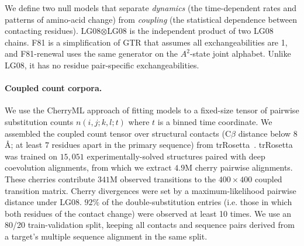 \documentclass{article}
\newcommand{\Pfam}{\textsc{Pfam}}
\begin{document}
We define two null models that separate \emph{dynamics} (the time-dependent rates and patterns 
of amino-acid change) from \emph{coupling} (the statistical dependence between contacting residues). 
LG08$\otimes$LG08 is the independent product of two LG08 chains. F81 is a simplification of GTR that assumes all exchangeabilities are 1, and F81-renewal uses the same generator on the $A^2$-state joint alphabet. Unlike LG08, it has no residue pair-specific exchangeabilities.

\paragraph{Coupled count corpora.} We use the CherryML approach of fitting models 
to a fixed-size tensor of pairwise substitution counts $n(i,j;k,l;t)$ where $t$ is a binned 
time coordinate. We assembled the coupled count tensor 
over structural contacts (C$\beta$ distance below $8$ \AA; at least $7$ residues 
apart in the primary sequence) from trRosetta~\cite{Yang2020trRosetta}. 
trRosetta was trained on $15{,}051$ 
experimentally-solved structures paired with deep coevolution alignments, 
from which we extract $4.9$M cherry pairwise alignments.
These cherries contribute $341$M observed transitions to the $400 \times 400$ 
coupled transition matrix. Cherry divergences were set by a 
maximum-likelihood pairwise distance under LG08. 
$92\%$ of the double-substitution entries (i.e. those in which both residues of the 
contact change) were observed at least 10 times.
We use an 80/20 train-validation split, keeping all contacts and sequence pairs 
derived from a target's multiple sequence alignment in the same split.

\end{document}
